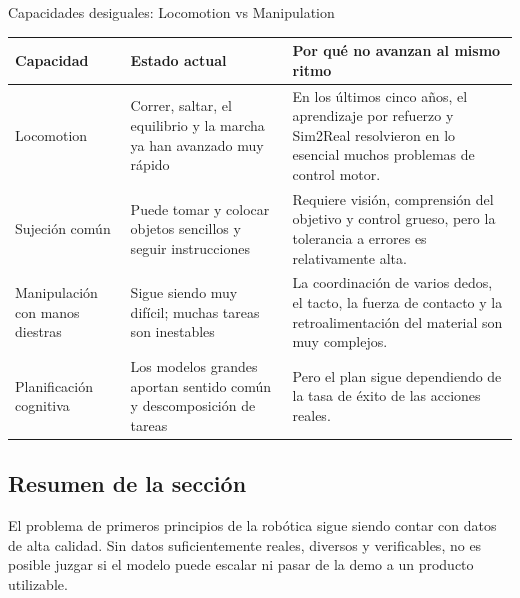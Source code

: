 \begin{knowledgebox}{Capacidades desiguales: Locomotion vs Manipulation}
\begin{tabularx}{\textwidth}{p{}p{}X}
\toprule
Capacidad & Estado actual & Por qué no avanzan al mismo ritmo \\
\midrule
Locomotion & Correr, saltar, el equilibrio y la marcha ya han avanzado muy rápido & En los últimos cinco años, el aprendizaje por refuerzo y Sim2Real resolvieron en lo esencial muchos problemas de control motor. \\
Sujeción común & Puede tomar y colocar objetos sencillos y seguir instrucciones & Requiere visión, comprensión del objetivo y control grueso, pero la tolerancia a errores es relativamente alta. \\
Manipulación con manos diestras & Sigue siendo muy difícil; muchas tareas son inestables & La coordinación de varios dedos, el tacto, la fuerza de contacto y la retroalimentación del material son muy complejos. \\
Planificación cognitiva & Los modelos grandes aportan sentido común y descomposición de tareas & Pero el plan sigue dependiendo de la tasa de éxito de las acciones reales. \\
\bottomrule
\end{tabularx}
\end{knowledgebox}

\subsection{Resumen de la sección}

El problema de primeros principios de la robótica sigue siendo contar con datos de alta calidad. Sin datos suficientemente reales, diversos y verificables, no es posible juzgar si el modelo puede escalar ni pasar de la demo a un producto utilizable.
